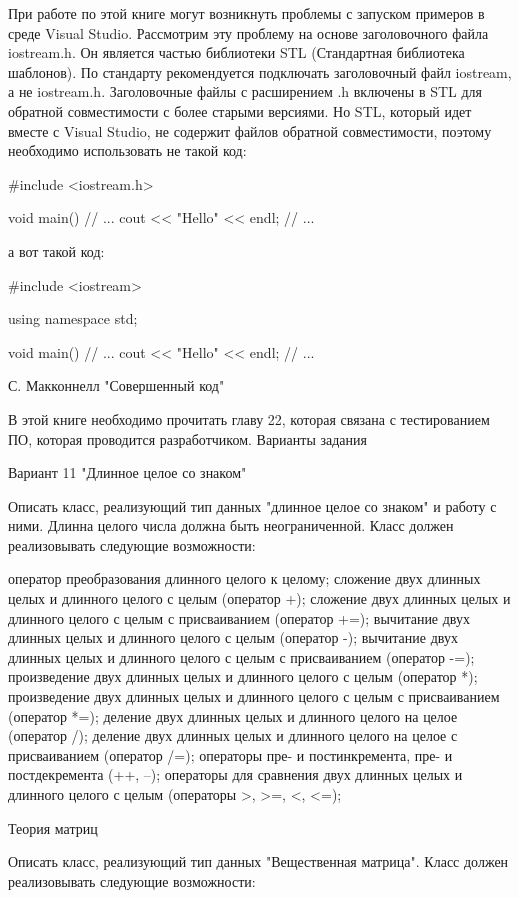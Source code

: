 \documentclass[a4paper,12pt]{article}
\begin{document}
При работе по этой книге могут возникнуть проблемы с запуском примеров в среде Visual Studio. Рассмотрим эту проблему на основе заголовочного файла iostream.h. Он является частью библиотеки STL (Стандартная библиотека шаблонов). По стандарту рекомендуется подключать заголовочный файл iostream, а не iostream.h. Заголовочные файлы с расширением .h включены в STL для обратной совместимости с более старыми версиями. Но STL, который идет вместе с Visual Studio, не содержит файлов обратной совместимости, поэтому необходимо использовать не такой код:

#include <iostream.h>

void main() {
// ...
cout << "Hello" << endl;
// ...
}

а вот такой код:

#include <iostream>

using namespace std;

void main() {
// ...
cout << "Hello" << endl;
// ...
}

С. Макконнелл "Совершенный код"

В этой книге необходимо прочитать главу 22, которая связана с тестированием ПО, которая проводится разработчиком.
Варианты задания



Вариант 11 "Длинное целое со знаком"

Описать класс, реализующий тип данных "длинное целое со знаком" и работу с ними. Длинна целого числа должна быть неограниченной. Класс должен реализовывать следующие возможности:

оператор преобразования длинного целого к целому;
сложение двух длинных целых и длинного целого с целым (оператор +);
сложение двух длинных целых и длинного целого с целым с присваиванием (оператор +=);
вычитание двух длинных целых и длинного целого с целым (оператор -);
вычитание двух длинных целых и длинного целого с целым с присваиванием (оператор -=);
произведение двух длинных целых и длинного целого с целым (оператор *);
произведение двух длинных целых и длинного целого с целым с присваиванием (оператор *=);
деление двух длинных целых и длинного целого на целое (оператор /);
деление двух длинных целых и длинного целого на целое с присваиванием (оператор /=);
операторы пре- и постинкремента, пре- и постдекремента (++, --);
операторы для сравнения двух длинных целых и длинного целого с целым (операторы >, >=, <, <=); 

Теория матриц

Описать класс, реализующий тип данных "Вещественная матрица".
Класс должен реализовывать следующие возможности:
\end{document}
